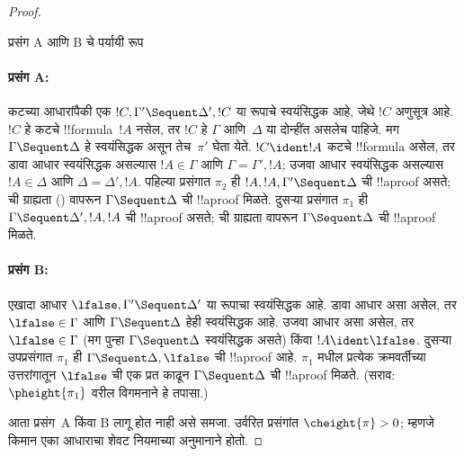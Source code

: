\documentclass[../../../include/open-logic-section]{subfiles}
\begin{document}
\begin{proof}
\begin{center}
प्रसंग A आणि B चे पर्यायी रूप
\end{center}

\paragraph{प्रसंग A:}
कटच्या आधारांपैकी एक
$!C, \Gamma' \Sequent \Delta', !C$
या रूपाचे स्वयंसिद्धक आहे,
जेथे $!C$ अणुसूत्र आहे.
$!C$ हे कटचे !!{formula}~$!A$
नसेल, तर $!C$ हे $\Gamma$
आणि~$\Delta$ या दोन्हींत
असलेच पाहिजे. मग
$\Gamma \Sequent \Delta$
हे स्वयंसिद्धक असून तेच~$\pi'$
घेता येते. $!C \ident !A$
कटचे !!{formula} असेल, तर
डावा आधार स्वयंसिद्धक असल्यास
$!A \in \Gamma$ आणि
$\Gamma = \Gamma', !A$;
उजवा आधार स्वयंसिद्धक असल्यास
$!A \in \Delta$ आणि
$\Delta = \Delta', !A$.
पहिल्या प्रसंगात $\pi_2$
ही $!A, !A, \Gamma' \Sequent \Delta$
ची !!a{proof} असते;
\LeftR{\Contraction} ची ग्राह्यता
()
वापरून $\Gamma \Sequent \Delta$
ची !!a{proof} मिळते.
दुसऱ्या प्रसंगात $\pi_1$
ही $\Gamma \Sequent \Delta', !A, !A$
ची !!a{proof} असते;
\RightR{\Contraction} ची ग्राह्यता
वापरून $\Gamma \Sequent \Delta$
ची !!a{proof} मिळते.

\paragraph{प्रसंग B:}
एखादा आधार
$\lfalse, \Gamma' \Sequent \Delta'$
या रूपाचा स्वयंसिद्धक आहे.
डावा आधार असा असेल, तर
$\lfalse \in \Gamma$ आणि
$\Gamma \Sequent \Delta$
हेही स्वयंसिद्धक आहे. उजवा
आधार असा असेल, तर
$\lfalse \in \Gamma$
(मग पुन्हा $\Gamma \Sequent \Delta$
स्वयंसिद्धक असते) किंवा
$!A \ident \lfalse$.
दुसऱ्या उपप्रसंगात $\pi_1$
ही $\Gamma \Sequent \Delta, \lfalse$
ची !!a{proof} आहे. $\pi_1$
मधील प्रत्येक क्रमवर्तीच्या
उत्तरांगातून $\lfalse$ ची
एक प्रत काढून
$\Gamma \Sequent \Delta$
ची !!a{proof} मिळते.
(सराव: $\pheight{\pi_1}$
वरील विगमनाने हे तपासा.)

आता प्रसंग~A किंवा B लागू
होत नाही असे समजा. उर्वरित
प्रसंगांत $\cheight{\pi} > 0$;
म्हणजे किमान एका आधाराचा
शेवट नियमाच्या अनुमानाने होतो.


\end{proof}
\end{document}
